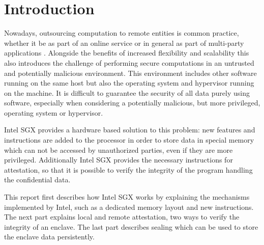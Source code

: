 \section{Introduction} \label{sec:introduction}
Nowadays, outsourcing computation to remote entities is common practice, whether it be as part of an online service or 
in general as part of multi-party applications \cite{UseOfIntelSGX}. 
Alongside the benefits of increased flexibility and scalability this also introduces the challenge of performing secure 
computations in an untrusted and potentially malicious environment. 
This environment includes other software running on the same host but also the operating system and hypervisor running
on the machine.
It is difficult to guarantee the security of all data purely using software, especially when considering a potentially 
malicious, but more privileged, operating system or hypervisor.

Intel SGX provides a hardware based solution to this problem: new features and instructions are added to the processor
in order to store data in special memory which can not be accessed by unauthorized parties, even if they are more
privileged. Additionally Intel SGX provides the necessary instructions for attestation, so that it is possible to
verify the integrity of the program handling the confidential data.

This report first describes how Intel SGX works by explaining the mechanisms implemented by Intel, such as a
dedicated memory layout and new instructions. The next part explains local and remote attestation, two ways to
verify the integrity of an enclave. The last part describes sealing which can be used to store the enclave data
persistently.
